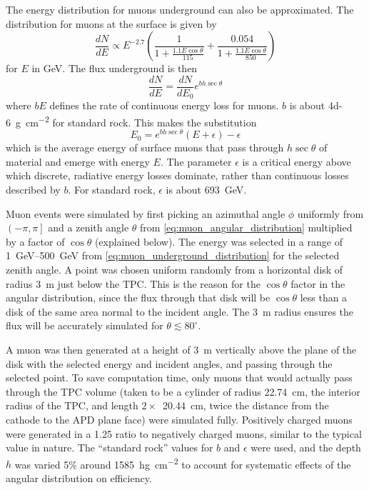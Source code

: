 \documentclass[herrin-thesis.tex]{subfiles}
\begin{document}
The energy distribution for muons underground can also be approximated\cite{Gaisser:1990kx}. The distribution for muons at the surface is given by
\begin{equation}
\label{eq:muon_surface_distribution}
\frac{dN}{dE} \propto E^{-2.7}\left(\frac{1}{1+\frac{1.1 E \cos \theta}{115}} + \frac{0.054}{1+\frac{1.1 E \cos \theta}{850}}\right)
\end{equation}
for \(E\) in \si{\GeV}. The flux underground is then
\begin{equation}
\label{eq:muon_underground_distribution}
\frac{dN}{dE} = \frac{dN}{dE_0}e^{b h \sec \theta}
\end{equation}
where \(b E\) defines the rate of continuous energy loss for muons. \(b\) is about \SI{4d-6}{\g\per\square\cm} for standard rock. This makes the substitution
\begin{equation}
\label{eq:muon_E0_def}
E_0 = e^{b h \sec \theta}\left(E + \epsilon\right) - \epsilon
\end{equation}
which is the average energy of surface muons that pass through \(h\sec\theta\) of material and emerge with energy \(E\). The parameter \(\epsilon\) is a critical energy above which discrete, radiative energy losses dominate, rather than continuous losses described by \(b\). For standard rock, \(\epsilon\) is about \SI{693}{\GeV}\cite{groom:2001ys}.

Muon events were simulated by first picking an azimuthal angle \(\phi\) uniformly from \(\left(-\pi, \pi\right]\) and a zenith angle \(\theta\) from \cref{eq:muon_angular_distribution} multiplied by a factor of \(\cos\theta\) (explained below). The energy was selected in a range of \SIrange{1}{500}{\GeV} from \cref{eq:muon_underground_distribution} for the selected zenith angle. A point was chosen uniform randomly from a horizontal disk of radius \SI{3}{\m} just below the TPC. This is the reason for the \(\cos\theta\) factor in the angular distribution, since the flux through that disk will be \(\cos\theta\) less than a disk of the same area normal to the incident angle. The \SI{3}{\m} radius ensures the flux will be accurately simulated for \(\theta \lesssim 80^{\circ}\).

A muon was then generated at a height of \SI{3}{\meter} vertically above the plane of the disk with the selected energy and incident angles, and passing through the selected point. To save computation time, only muons that would actually pass through the TPC volume (taken to be a cylinder of radius  \SI{22.74}{\cm}, the interior radius of the TPC, and length \(2\times\)~\SI{20.44}{\cm}, twice the distance from the cathode to the APD plane face) were simulated fully. Positively charged muons were generated in a 1.25 ratio to negatively charged muons, similar to the typical value in nature. The ``standard rock'' values for \(b\) and \(\epsilon\) were used, and the depth \(h\) was varied 5\% around \SI{1585}{\hecto\g\per\square\cm} to account for systematic effects of the angular distribution on efficiency.
\end{document}
